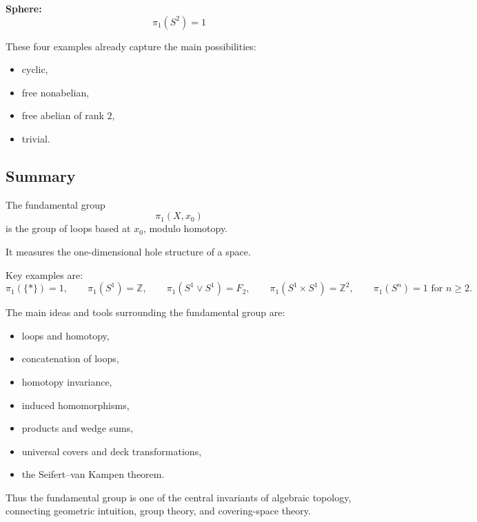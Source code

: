 \documentclass[12pt,a4paper]{article}
\theoremstyle{notespace}
\begin{document}
\textbf{Sphere:}
\[
\pi_1(S^2)=1
\]

These four examples already capture the main possibilities:
\begin{itemize}
	\item cyclic,
	\item free nonabelian,
	\item free abelian of rank \(2\),
	\item trivial.
\end{itemize}

\bigskip

\subsection{Summary}

The fundamental group
\[
\pi_1(X,x_0)
\]
is the group of loops based at \(x_0\), modulo homotopy.

It measures the one-dimensional hole structure of a space.

Key examples are:
\[
\pi_1(\{*\})=1,
\qquad
\pi_1(S^1)=\mathbb Z,
\qquad
\pi_1(S^1\vee S^1)=F_2,
\qquad
\pi_1(S^1\times S^1)=\mathbb Z^2,
\qquad
\pi_1(S^n)=1\text{ for }n\ge 2.
\]

The main ideas and tools surrounding the fundamental group are:
\begin{itemize}
	\item loops and homotopy,
	\item concatenation of loops,
	\item homotopy invariance,
	\item induced homomorphisms,
	\item products and wedge sums,
	\item universal covers and deck transformations,
	\item the Seifert--van Kampen theorem.
\end{itemize}

Thus the fundamental group is one of the central invariants of algebraic topology, connecting geometric intuition, group theory, and covering-space theory.
\end{document}
